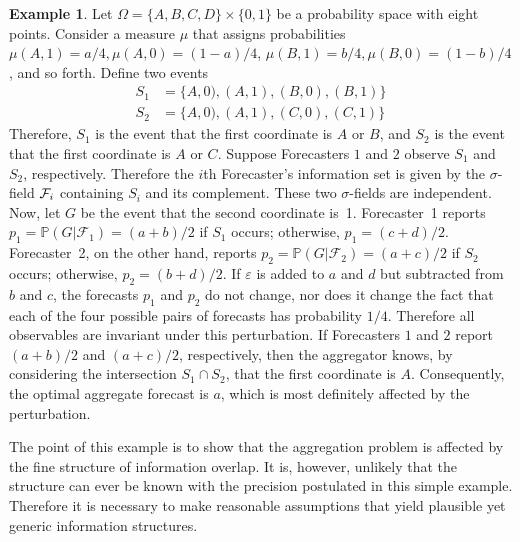\documentclass[11pt]{article}
\renewcommand{\P}{\mathbb{P}}
\theoremstyle{definition}
\newtheorem{example}[theorem]{Example}
\theoremstyle{definition}
\def\F{{\cal F}}
\def\P{{\mathbb P}}
\def\ee{\varepsilon}
\begin{document}
\begin{example}
Let $\Omega = \{ A,B,C,D \} \times \{ 0,1 \}$ be a probability space
with eight points.  Consider a measure $\mu$ that assigns
probabilities $\mu (A,1) = a/4, \mu (A,0) = (1-a)/4$, $\mu (B,1) =
b/4, \mu (B,0) = (1-b)/4$, and so forth. Define two events
\begin{align*}
 S_1 &= \{A,0),(A,1),(B,0),(B,1) \}\\
 S_2 &= \{A,0),(A,1),(C,0),(C,1) \}
\end{align*}
Therefore, $S_1$ is the event that the first coordinate is
$A$ or $B$, and $S_2$ is the event that the first coordinate
is $A$ or $C$. Suppose Forecasters $1$ and $2$ observe $S_1$
and $S_2$, respectively. Therefore the $i$th Forecaster's information set is
given by the $\sigma$-field $\F_i$ containing $S_i$ and its
complement. These two $\sigma$-fields are independent. Now, let
$G$ be the event that the second coordinate is~1.  Forecaster~1
reports $p_1 = \P(G | \mathcal{F}_1) = (a+b)/2$ if $S_1$ occurs;
otherwise, $p_1 = (c+d)/2$.  Forecaster~2, on the other hand, reports
$p_2 = \P(G | \mathcal{F}_2) = (a+c)/2$ if $S_2$ occurs; otherwise,
$p_2 = (b+d)/2$.  If $\ee$ is added to $a$ and $d$ but subtracted from
$b$ and $c$, the forecasts $p_1$ and $p_2$ do not change, nor does it
change the fact that each of the four possible pairs of forecasts has
probability $1/4$.  Therefore all observables are invariant under
this perturbation.  If Forecasters $1$ and $2$ report $(a+b)/2$ and
$(a+c)/2$, respectively, then the aggregator knows, by considering the
intersection $S_1 \cap S_2$, that the first coordinate is $A$.
Consequently, the optimal aggregate forecast is $a$, which is most
definitely affected by the perturbation.
\end{example}

The point of this example is to show that the aggregation problem is affected
by the fine structure of information overlap.  It is, however, unlikely
that the structure can ever be known with the precision postulated in
this simple example.  Therefore it is necessary to make reasonable
assumptions that yield plausible yet generic information structures.
\end{document}
